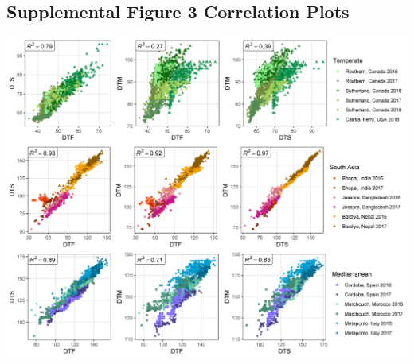\documentclass[
]{article}
\begin{document}
\hypertarget{supplemental-figure-3-correlation-plots}{%
\subsection{Supplemental Figure 3 Correlation
Plots}\label{supplemental-figure-3-correlation-plots}}

\includegraphics{Supplemental_Figure_03.png}
\end{document}
